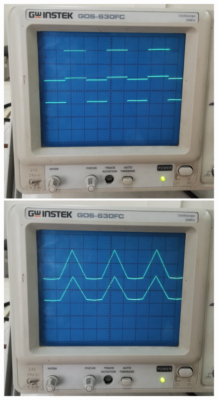 \documentclass[letter,twoside,11pt]{article}
\begin{document}
\begin{figure}[!h]
\centering
\includegraphics[scale=0.073]{fotos/labo1.12.eps}
\includegraphics[scale=0.080]{fotos/labo1.13.eps}

\end{figure}
\end{document}
